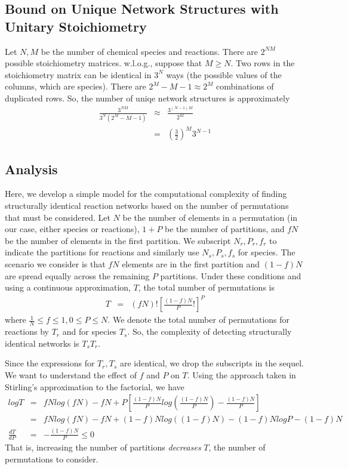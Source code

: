 \documentclass{article}
\begin{document}
\subsection{Bound on Unique Network Structures with Unitary Stoichiometry}
Let $N,M$ be the number of chemical species and reactions.
There are $2^{NM}$ possible stoichiometry matrices.
w.l.o.g., suppose that $M \geq N$.
Two rows in the stoichiometry matrix can be identical in
$3^N$ ways (the possible values of the columns, which are species). There are $2^M - M - 1 \approx 2^M$ combinations of duplicated rows. So, the number of uniqe network structures is approximately
\begin{eqnarray}
    \frac{3^{NM}}{3^N(2^M - M - 1)}& \approx &
    \frac{3^{(N-1)M}}{2^M} \\
    & = & \left( \frac{3}{2} \right)^M 3^{N-1}
\end{eqnarray}

\subsection{Analysis}
Here, we develop a simple model for the computational complexity of finding structurally identical reaction networks based on the number of permutations that must be considered.
Let $N$ be the number of elements in a permutation (in our case, either species or reactions), $1 + P$ be the number of partitions, and $fN$ be the number of elements in the first partition. We subscript $N_r, P_r, f_r$ to indicate the partitions for reactions and similarly use  $N_s, P_s, f_s$ for species. The scenario we consider is that $fN$ elements are in the first partition and $(1-f)N$ are spread equally across the remaining $P$ partitions. Under these conditions and using a continuous approximation, $T$, the total number of permutations is
\begin{eqnarray}
    T & = & \left( fN \right) ! \left[ \frac{(1-f)N}{P}! \right]^P
\end{eqnarray}
where $\frac{1}{N} \leq f \leq 1, 0 \leq P \leq N$. We denote the total number of permutations for reactions by $T_r$ and for species $T_s$. So, the complexity of detecting structurally identical networks is $T_s T_r$.

Since the expressions for $T_r, T_s$ are identical, we drop the subscripts in the sequel. We want to understand the effect of $f$ and $P$ on $T$. Using the approach taken in Stirling's approximation to the factorial, we have
\begin{eqnarray}
    log T & = & fN log (f N) - fN +
    P \left[ \frac{(1-f)N}{P}log \left( \frac{(1-f)N}{P} \right) - 
    \frac{(1-f)N}{P} \right] \nonumber \\
     & = & fN log (f N) - fN +
     (1-f)N  log ( (1-f)N  ) - (1-f)N  log P - (1-f)N \nonumber \\
    \frac{dT}{dP} & = & - \frac{(1-f)N}{P} \leq  0
\end{eqnarray}
That is, increasing the number of partitions {\em decreases} $T$, the number of permutations to consider.
\end{document}
